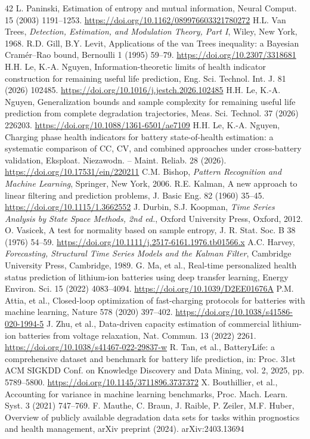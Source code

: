 \begin{thebibliography}{42}
 L. Paninski, Estimation of entropy and mutual information, Neural Comput. 15 (2003) 1191--1253. \url{https://doi.org/10.1162/089976603321780272}
 H.L. Van Trees, {\it Detection, Estimation, and Modulation Theory, Part I}, Wiley, New York, 1968.
 R.D. Gill, B.Y. Levit, Applications of the van Trees inequality: a Bayesian Cram\'er--Rao bound, Bernoulli 1 (1995) 59--79. \url{https://doi.org/10.2307/3318681}
 H.H. Le, K.-A. Nguyen, Information-theoretic limits of health indicator construction for remaining useful life prediction, Eng. Sci. Technol. Int. J. 81 (2026) 102485. \url{https://doi.org/10.1016/j.jestch.2026.102485}
 H.H. Le, K.-A. Nguyen, Generalization bounds and sample complexity for remaining useful life prediction from complete degradation trajectories, Meas. Sci. Technol. 37 (2026) 226203. \url{https://doi.org/10.1088/1361-6501/ae7109}
 H.H. Le, K.-A. Nguyen, Charging phase health indicators for battery state-of-health estimation: a systematic comparison of CC, CV, and combined approaches under cross-battery validation, Eksploat. Niezawodn. -- Maint. Reliab. 28 (2026). \url{https://doi.org/10.17531/ein/220211}
 C.M. Bishop, {\it Pattern Recognition and Machine Learning}, Springer, New York, 2006.
 R.E. Kalman, A new approach to linear filtering and prediction problems, J. Basic Eng. 82 (1960) 35--45. \url{https://doi.org/10.1115/1.3662552}
 J. Durbin, S.J. Koopman, {\it Time Series Analysis by State Space Methods, 2nd ed.}, Oxford University Press, Oxford, 2012.
 O. Vasicek, A test for normality based on sample entropy, J. R. Stat. Soc. B 38 (1976) 54--59. \url{https://doi.org/10.1111/j.2517-6161.1976.tb01566.x}
 A.C. Harvey, {\it Forecasting, Structural Time Series Models and the Kalman Filter}, Cambridge University Press, Cambridge, 1989.
 G. Ma, et al., Real-time personalized health status prediction of lithium-ion batteries using deep transfer learning, Energy Environ. Sci. 15 (2022) 4083--4094. \url{https://doi.org/10.1039/D2EE01676A}
 P.M. Attia, et al., Closed-loop optimization of fast-charging protocols for batteries with machine learning, Nature 578 (2020) 397--402. \url{https://doi.org/10.1038/s41586-020-1994-5}
 J. Zhu, et al., Data-driven capacity estimation of commercial lithium-ion batteries from voltage relaxation, Nat. Commun. 13 (2022) 2261. \url{https://doi.org/10.1038/s41467-022-29837-w}
 R. Tan, et al., BatteryLife: a comprehensive dataset and benchmark for battery life prediction, in: Proc. 31st ACM SIGKDD Conf. on Knowledge Discovery and Data Mining, vol. 2, 2025, pp. 5789--5800. \url{https://doi.org/10.1145/3711896.3737372}
 X. Bouthillier, et al., Accounting for variance in machine learning benchmarks, Proc. Mach. Learn. Syst. 3 (2021) 747--769.
 F. Mauthe, C. Braun, J. Raible, P. Zeiler, M.F. Huber, Overview of publicly available degradation data sets for tasks within prognostics and health management, arXiv preprint (2024). arXiv:2403.13694
\end{thebibliography}
